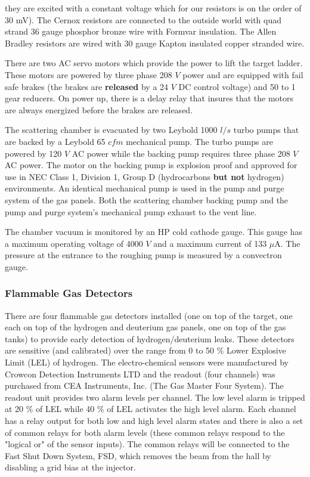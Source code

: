 \begin{safetyen}{10}{5}
{\begin{description}
they are excited with a constant voltage which for our resistors is
on the order of 30 mV). The Cernox resistors are connected to the outside world
with quad strand 36 gauge phosphor bronze wire with Formvar insulation.
The Allen Bradley resistors are wired with 30 gauge Kapton insulated 
copper stranded wire.
\item[{\bf Target Lifter}] There are two AC servo motors which provide
the power to lift the target ladder. These motors are powered by three
phase 208 $V$ power and are equipped with fail safe brakes (the brakes are
{\bf released} by a 24 $V$ DC control voltage)
and 50 to 1 gear reducers. On power up, there is a delay relay
that insures that
the motors are always energized before the brakes are released.
\item[{\bf Vacuum Pumps}] The scattering chamber is evacuated by two Leybold
1000 $l/s$ turbo pumps that are  backed by a Leybold 65 $cfm$
mechanical pump. The turbo pumps are powered by 120 $V$ AC power while the
backing pump requires three phase 208 $V$ AC power. The motor on the backing 
pump is explosion proof and approved for use in NEC Class 1, Division 1,
Group D (hydrocarbons {\bf but not} hydrogen) environments. An identical
mechanical pump is used in the pump and purge system of the gas panels.
Both the scattering chamber backing pump and the
pump and purge system's mechanical pump exhaust to the vent line. 
\item[{\bf Vacuum Gauges}] The chamber vacuum is monitored by an
HP cold cathode gauge. This gauge has a maximum operating voltage of 
4000 $V$ and a maximum
current of 133 $\mu$A. The pressure at the entrance to the roughing pump
is measured by a convectron gauge.
\end{description}
}

\subsubsection{ Flammable Gas Detectors}

There are four flammable gas detectors installed (one on top of the target,
one each on top of the hydrogen and deuterium gas panels, one on top of the gas
tanks)
to provide early detection
of hydrogen/deuterium leaks. These detectors are sensitive (and calibrated)
over the range from 0 to 50 $\%$ Lower Explosive Limit (LEL) of hydrogen.
The electro-chemical sensors were manufactured by Crowcon Detection
Instruments LTD and
the readout (four channels) was purchased from CEA Instruments, Inc. 
(The Gas Master Four System). The readout unit provides two alarm
levels per channel. The low level alarm is tripped at 20 $\%$ of LEL
while 40 $\%$ of LEL activates the high level alarm.
Each channel has a relay output for both low and high level alarm
states and there is also a set of common relays for both alarm
levels (these common relays respond to the "logical or" of the sensor inputs).
The common relays will be connected to the Fast Shut Down System, FSD,
which removes the beam from the hall by disabling a grid bias at the
injector.
\end{safetyen}

